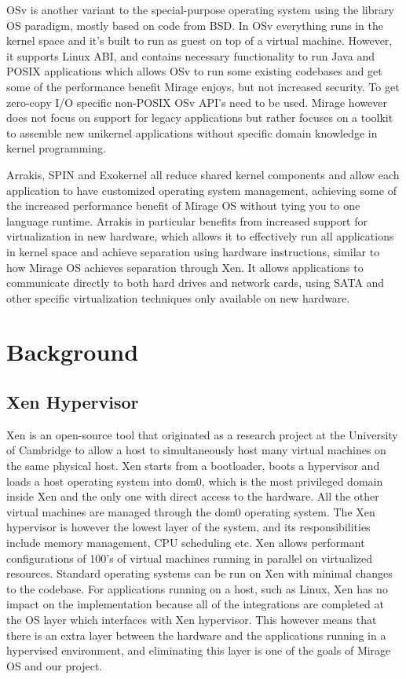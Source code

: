 \documentclass[english,10pt,twocolumn]{article}
\begin{document}
OSv\cite{osv} is another variant to the special-purpose operating system using the library OS paradigm, mostly based on code from BSD.
In OSv everything runs in the kernel space and it's built to run as guest on top of a virtual machine.
However, it supports Linux ABI, and contains necessary functionality to run Java and POSIX applications which allows OSv to run some existing codebases and get some of the performance benefit Mirage enjoys, but not increased security.
To get zero-copy I/O specific non-POSIX OSv API's need to be used.
Mirage however does not focus on support for legacy applications but rather focuses on a toolkit to assemble new unikernel applications without specific domain knowledge in kernel programming.

Arrakis\cite{arrakis}, SPIN\cite{spin} and Exokernel\cite{exokernel} all reduce shared kernel components and allow each application to have customized operating system management, achieving some of the increased performance benefit of Mirage OS without tying you to one language runtime.
Arrakis in particular benefits from increased support for virtualization in new hardware, which allows it to effectively run all applications in kernel space and achieve separation using hardware instructions, similar to how Mirage OS achieves separation through Xen.
It allows applications to communicate directly to both hard drives and network cards, using SATA and other specific virtualization techniques only available on new hardware.



\section{Background}



\subsection{Xen Hypervisor}

Xen is an open-source tool that originated as a research project at the University of Cambridge to allow a host to simultaneously host many virtual machines on the same physical host.
Xen starts from a bootloader, boots a hypervisor and loads a host operating system into dom0, which is the most privileged domain inside Xen and the only one with direct access to the hardware.
All the other virtual machines are managed through the dom0 operating system.
The Xen hypervisor is however the lowest layer of the system, and its responsibilities include memory management, CPU scheduling etc.
Xen allows performant configurations of 100's of virtual machines running in parallel on virtualized resources.
Standard operating systems can be run on Xen with minimal changes to the codebase.
For applications running on a host, such as Linux, Xen has no impact on the implementation because all of the integrations are completed at the OS layer which interfaces with Xen hypervisor.
This however means that there is an extra layer between the hardware and the applications running in a hypervised environment, and eliminating this layer is one of the goals of Mirage OS and our project.
\end{document}
